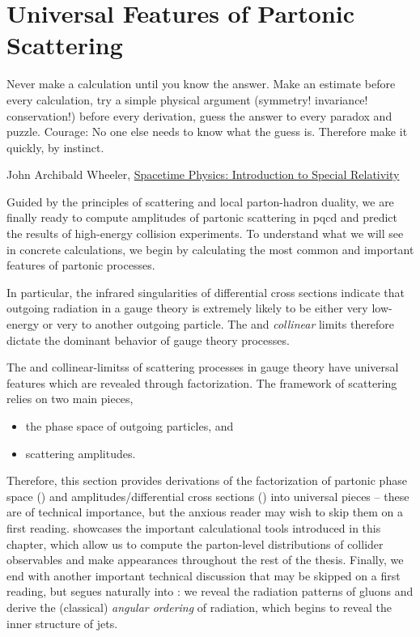 \section{Universal Features of Partonic Scattering}
\label{sec:universal-features}


\epigraph{
    Never make a calculation until you know the answer.
    Make an estimate before every calculation, try a simple physical argument (symmetry! invariance! conservation!) before every derivation, guess the answer to every paradox and puzzle.
    Courage: No one else needs to know what the guess is.
    Therefore make it quickly, by instinct.
}
{
John Archibald Wheeler, \underline{Spacetime Physics: Introduction to Special Relativity}
}

Guided by the principles of scattering and local parton-hadron duality, we are finally ready to compute amplitudes of partonic scattering in \gls{pqcd} and predict the results of high-energy collision experiments.
%
To understand what we will see in concrete calculations, we begin by calculating the most common and important features of partonic processes.

In particular, the infrared singularities of differential cross sections indicate that outgoing radiation in a gauge theory is extremely likely to be either very low-energy or very  to another outgoing particle.
%
The \textit{} and \textit{collinear} limits therefore dictate the dominant behavior of gauge theory processes.

The  and \glspl{collinear-limit}s of scattering processes in gauge theory have universal features which are revealed through \gls{factorization}.
%
The framework of scattering relies on two main pieces,
\begin{itemize}
    \item
        the phase space of outgoing particles, and

    \item
        scattering amplitudes.
\end{itemize}
%
Therefore, this section provides derivations of the factorization of partonic phase space () and amplitudes/differential cross sections () into universal pieces -- these are of technical importance, but the anxious reader may wish to skip them on a first reading.
%
 showcases the important calculational tools introduced in this chapter, which allow us to compute the parton-level distributions of collider observables and make appearances throughout the rest of the thesis.
%
Finally, we end with another important technical discussion that may be skipped on a first reading, but segues naturally into :
%
we reveal the radiation patterns of  gluons and derive the (classical) \textit{angular ordering} of  radiation, which begins to reveal the inner structure of jets.

